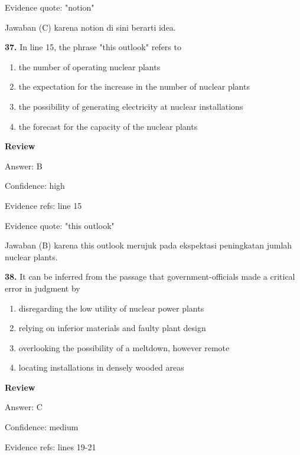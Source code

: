 \documentclass[12pt]{article}
\begin{document}
Evidence quote: "notion"\par
Jawaban (C) karena notion di sini berarti idea.\par
\endgroup
\par
\vspace{0.25\baselineskip}
\noindent\textbf{37.} In line 15, the phrase "this outlook" refers to
\begin{enumerate}[label=(\Alph*),leftmargin=*,itemsep=0.2em]
\item the number of operating nuclear plants
\item the expectation for the increase in the number of nuclear plants
\item the possibility of generating electricity at nuclear installations
\item the forecast for the capacity of the nuclear plants
\end{enumerate}
\par
\begingroup
\setlength{\parskip}{0pt}
\setlength{\parindent}{0pt}
\textbf{Review}\par
Answer: B\par
Confidence: high\par
Evidence refs: line 15\par
Evidence quote: "this outlook"\par
Jawaban (B) karena this outlook merujuk pada ekspektasi peningkatan jumlah nuclear plants.\par
\endgroup
\par
\vspace{0.25\baselineskip}
\noindent\textbf{38.} It can be inferred from the passage that government-officials made a critical error in judgment by
\begin{enumerate}[label=(\Alph*),leftmargin=*,itemsep=0.2em]
\item disregarding the low utility of nuclear power plants
\item relying on inferior materials and faulty plant design
\item overlooking the possibility of a meltdown, however remote
\item locating installations in densely wooded areas
\end{enumerate}
\par
\begingroup
\setlength{\parskip}{0pt}
\setlength{\parindent}{0pt}
\textbf{Review}\par
Answer: C\par
Confidence: medium\par
Evidence refs: lines 19-21\par
\end{document}
